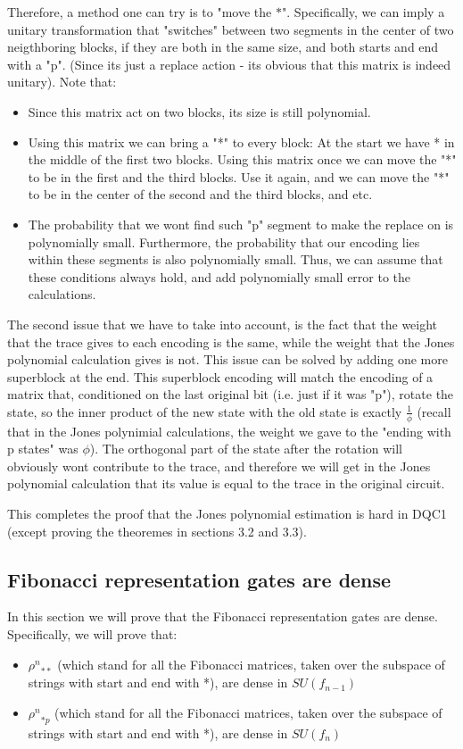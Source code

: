 \documentclass{article}
\begin{document}
Therefore, a method one can try is to "move the $*$". Specifically, we can imply a unitary transformation that "switches" between two segments in the center of two neigthboring blocks, if they are both in the same size, and both starts and end with a "p". (Since its just a replace action - its obvious that this matrix is indeed unitary). Note that:
\begin{itemize}
\item Since this matrix act on two blocks, its size is still polynomial.
\item Using this matrix we can bring a "*" to every block: At the start we have * in the middle of the first two blocks. Using this matrix once we can move the "*" to be in the first and the third blocks. Use it again, and we can move the "*" to be in the center of the second and the third blocks, and etc.
\item The probability that we wont find such "p" segment to make the replace on is polynomially small. Furthermore, the probability that our encoding lies within these segments is also polynomially small. Thus, we can assume that these conditions always hold, and add polynomially small error to the calculations. 
\end{itemize}

The second issue that we have to take into account, is the fact that the weight that the trace gives to each encoding is the same, while the weight that the Jones polynomial calculation gives is not. This issue can be solved by adding  one more superblock at the end. This superblock encoding will match the encoding of a matrix that, conditioned on the last original bit (i.e. just if it was "p"), rotate the state, so the inner product of the new state with the old state is exactly $\frac{1}{\phi}$ (recall that in the Jones polynimial calculations, the weight we gave to the "ending with p states" was $\phi$). The orthogonal part of the state after the rotation will obviously wont contribute to the trace, and therefore we will get in the Jones polynomial calculation that its value is equal to the trace in the original circuit.

This completes the proof that the Jones polynomial estimation is hard in DQC1 (except proving the theoremes in sections 3.2 and 3.3). 
\subsection{Fibonacci representation gates are dense}
In this section we will prove that the Fibonacci representation gates are dense. Specifically, we will prove that:
\begin{itemize}
\item ${\rho^{n}}_{**}$ (which stand for all the Fibonacci matrices, taken over the subspace of strings with start and end with *), are dense in $SU(f_{n-1})$
\item ${\rho^{n}}_{*p}$ (which stand for all the Fibonacci matrices, taken over the subspace of strings with start and end with *), are dense in $SU(f_{n})$
\end{itemize}
\end{document}
